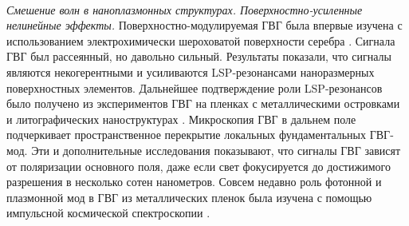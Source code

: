 \\
\hspace*{2mm}
\textit{Смешение волн в наноплазмонных структурах. Поверхностно-усиленные нелинейные эффекты.} Поверхностно-модулируемая ГВГ была впервые изучена с использованием электрохимически шероховатой поверхности серебра \cite{chen1981surface}. Сигнала ГВГ был рассеянный, но давольно сильный. Результаты показали, что сигналы являются некогерентными и усиливаются LSP-резонансами наноразмерных поверхностных элементов. Дальнейшее подтверждение роли LSP-резонансов было получено из экспериментов ГВГ на пленках с металлическими островками и литографических наноструктурах \cite{wokaun1981surface}. Микроскопия ГВГ в дальнем поле подчеркивает пространственное перекрытие локальных фундаментальных ГВГ-мод. Эти и дополнительные исследования показывают, что сигналы ГВГ зависят от поляризации основного поля, даже если свет фокусируется до достижимого разрешения в несколько сотен нанометров.  Совсем недавно роль фотонной и плазмонной мод в ГВГ из металлических пленок была изучена с помощью импульсной космической спектроскопии \cite{grosse2012nonlinear}.

